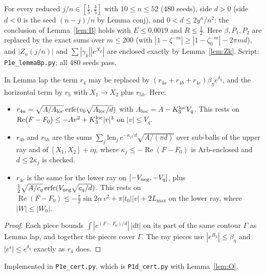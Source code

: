 \documentclass[11pt]{article}
\theoremstyle{definition}\newtheorem{definition}[theorem]{Definition}
\theoremstyle{remark}\newtheorem{remark}[theorem]{Remark}
\begin{document}
\begin{lemma}\label{lem:Bp}
For every reduced $j/n\in[\frac15,\frac45]$ with $10\le n\le52$ (480 seeds), side $d>0$ (side $d<0$ is the seed $(n-j)/n$ by Lemma conj), and $0<d\le2y^n/n^2$: the conclusion of Lemma~\ref{lem:B} holds with $E\le0.0019$ and $R\le\frac12$.
Here $\beta,P_1,P_2$ are replaced by the exact sums over $m\le200$ (with $|1-\zeta^{-m}|\ge|1-\zeta_0^{-m}|-2\pi md$), and $|Z_n(j/n)|$ and $\sum|\gamma_k||e^{X_k}|$ are enclosed exactly by Lemma~\ref{lem:Zk}. Script: \texttt{P1e\_lemmaBp.py}; all 480 seeds pass.
\end{lemma}

\begin{lemma}\label{lem:O}
In Lemma lap the term $r_4$ may be replaced by $(r_{4a}+r_{4b}+r_{4c})\beta_\eta e^{\delta_\eta}$, and the horizontal term by $r_5$ with $X_1\to X_2$ plus $r_{5h}$. Here:
\begin{itemize}
\item $r_{4a}=\sqrt{A/A_{\rm loc}}\operatorname{erfc}(v_0\sqrt{A_{\rm loc}/d})$ with $A_{\rm loc}=A-K_3^{\rm loc}V_q$. This rests on $\operatorname{Re}(F-F_0)\le-Av^2+K_3^{\rm loc}|v|^3$ on $|v|\le V_q$.
\item $r_{4b}$ and $r_{5h}$ are the sums $\sum_j\mathrm{len}_j\,e^{-\kappa_j/d}\sqrt{A/(\pi d)}$ over sub-balls of the upper ray and of $[X_1,X_2]+i\eta$, where $\kappa_j\le-\operatorname{Re}(F-F_0)$ is Arb-enclosed and $d\le2\kappa_j$ is checked.
\item $r_{4c}$ is the same for the lower ray on $[-V_{\rm neg},-V_q]$, plus $\frac12\sqrt{A/c_q}\operatorname{erfc}(V_{\rm neg}\sqrt{c_q/d})$. This rests on $\operatorname{Re}(F-F_0)\le-\frac\pi2\sin2\alpha\,v^2+\pi|t_0||v|+2L_{\max}$ on the lower ray, where $|W|\le|W_0|$.
\end{itemize}
\end{lemma}
\begin{proof}
Each piece bounds $\int|e^{(F-F_0)/d}|\,|dt|$ on its part of the same contour $\Gamma$ as Lemma lap, and together the pieces cover $\Gamma$. The ray pieces use $|e^{B_k}|\le\beta_\eta$ and $|e^{\epsilon}|\le e^{\delta_\eta}$ exactly as $r_4$ does.
\end{proof}
Implemented in \texttt{P1e\_cert.py}, which is \texttt{P1d\_cert.py} with Lemma~\ref{lem:O}.
\end{document}
